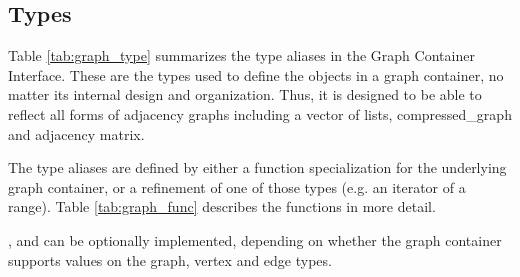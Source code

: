 \subsection{Types}
Table \ref{tab:graph_type} summarizes the type aliases in the Graph Container Interface. These are the types used to define the objects 
in a graph container, no matter its internal design and organization. Thus, it is designed to be able to reflect all forms of adjacency 
graphs including a vector of lists, compressed\_graph and adjacency matrix.

The type aliases are defined by either a function specialization for the underlying graph container, or a refinement of one of those types (e.g. an iterator of a range). Table \ref{tab:graph_func} describes the functions in more detail.

,  and  can be optionally implemented, depending on whether the graph container supports values on the graph, vertex and edge types.

